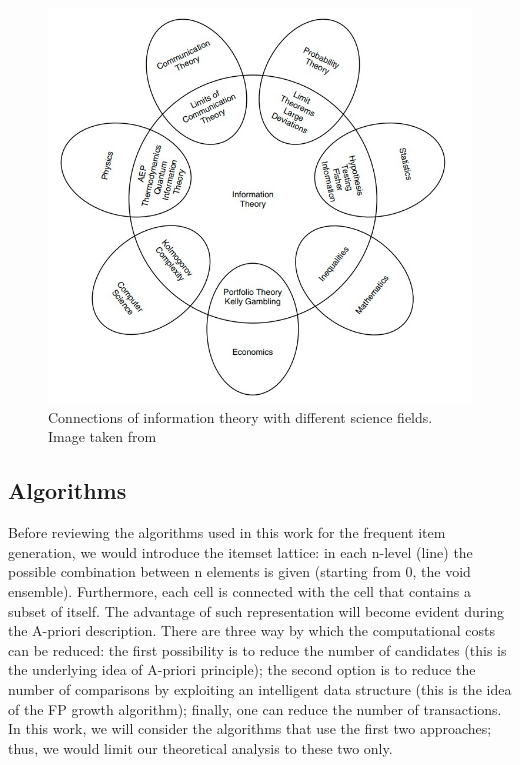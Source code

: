 \documentclass[12pt,%
               a4paper,%
               oneside,openany,%
               titlepage,%
               headinclude,footinclude,%
               BCOR5mm,%
               cleardoublepage=empty,%
               tablecaptionabove,%
               floatperchapter,
               ]{scrreprt}                 %
\begin{document}
\begin{figure}
\begin{center}
\includegraphics[width=\textwidth]{Figures/Information_theory_connections.jpg}
\caption{Connections of information theory with different science fields. Image taken from \cite{cover2006elements}}
\label{Information_theory_connections}
\end{center}
\end{figure}

\subsection{Algorithms}

Before reviewing the algorithms used in this work for the frequent item generation, we would introduce the itemset lattice: in each n-level (line) the possible combination between n elements is given (starting from 0, the void ensemble). Furthermore, each cell is connected with the cell that contains a subset of itself. The advantage of such representation will become evident during the A-priori description. There are three way by which the computational costs can be reduced: the first possibility is to reduce the number of candidates (this is the underlying idea of A-priori principle); the second option is to reduce the number of comparisons by exploiting an intelligent data structure (this is the idea of the FP growth algorithm); finally, one can reduce the number of transactions. In this work, we will consider the algorithms that use the first two approaches; thus, we would limit our theoretical analysis to these two only.
\end{document}
